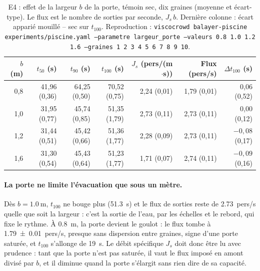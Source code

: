 \begin{table}[ht]
\centering
\caption{E4 : effet de la largeur $b$ de la porte, témoin sec, dix graines (moyenne
et écart-type). Le flux est le nombre de sorties par seconde, $J_s\,b$. Dernière
colonne : écart apparié mouillé -- sec sur $t_{100}$. Reproduction :
\texttt{viscocrowd balayer-piscine experiments/piscine.yaml --parametre largeur\_porte
--valeurs 0.8 1.0 1.2 1.6 --graines 1 2 3 4 5 6 7 8 9 10}.}
\label{tab:e4-porte}
\begin{tabular}{rrrrrrr}
\toprule
$b$ (m) & $t_{50}$ (s) & $t_{90}$ (s) & $t_{100}$ (s) & $J_s$ (pers/(m$\cdot$s)) & Flux (pers/s) & $\Delta t_{100}$ (s) \\
\midrule
0,8 & 41,96 (0,36) & 64,25 (0,50) & 70,52 (0,75) & 2,24 (0,01) & 1,79 (0,01) & 0,06 (0,52) \\
1,0 & 31,95 (0,77) & 45,74 (0,85) & 51,35 (1,79) & 2,73 (0,11) & 2,73 (0,11) & 0,00 (0,12) \\
1,2 & 31,44 (0,51) & 45,42 (0,66) & 51,36 (1,77) & 2,28 (0,09) & 2,73 (0,11) & $-0{,}08$ (0,17) \\
1,6 & 31,30 (0,54) & 45,43 (0,64) & 51,23 (1,77) & 1,71 (0,07) & 2,74 (0,11) & $-0{,}09$ (0,16) \\
\bottomrule
\end{tabular}
\end{table}

\paragraph{La porte ne limite l'évacuation que sous un mètre.}
Dès $b=\SI{1.0}{\metre}$, $t_{100}$ ne bouge plus (\SI{51.3}{\second}) et le flux de
sorties reste de \num{2.73}~pers/s quelle que soit la largeur : c'est la sortie de
l'eau, par les échelles et le rebord, qui fixe le rythme. À \SI{0.8}{\metre}, la porte
devient le goulot : le flux tombe à \num{1.79 \pm 0.01}~pers/s, presque sans dispersion
entre graines, signe d'une porte saturée, et $t_{100}$ s'allonge de \SI{19}{\second}. Le
débit spécifique $J_s$ doit donc être lu avec prudence : tant que la porte n'est pas saturée,
il vaut le flux imposé en amont divisé par $b$, et il diminue quand la porte s'élargit sans
rien dire de sa capacité.

